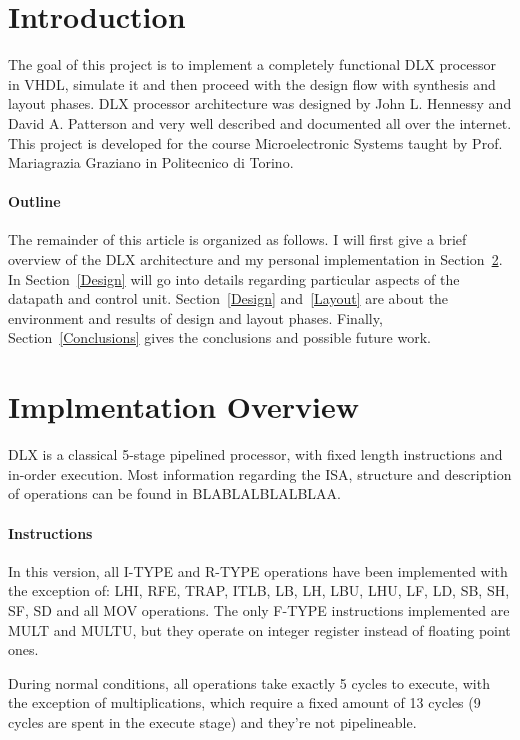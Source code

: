\documentclass[12pt]{article}
\begin{document}
\maketitle


\section{Introduction}
The goal of this project is to implement a completely functional DLX processor in VHDL, simulate it and then proceed with the design flow with synthesis and layout phases.
DLX processor architecture was designed by John L. Hennessy and David A. Patterson and very well described and documented all over the internet.
This project is developed for the course Microelectronic Systems taught by Prof. Mariagrazia Graziano in Politecnico di Torino.



\paragraph{Outline}
The remainder of this article is organized as follows. 
I will first give a brief overview of the DLX architecture and my personal implementation in Section~\ref{Overview}.
In Section~\ref{Design} will go into details regarding particular aspects of the datapath and control unit.
Section~\ref{Design} and~\ref{Layout} are about the environment and results of design and layout phases.
Finally, Section~\ref{Conclusions} gives the conclusions and possible future work.

\section{Implmentation Overview}\label{Overview}
DLX is a classical 5-stage pipelined processor, with fixed length instructions and in-order execution.
Most information regarding the ISA, structure and description of operations can be found in BLABLALBLALBLAA.
\paragraph{Instructions}
In this version, all I-TYPE and R-TYPE operations have been implemented with the exception of: LHI, RFE, TRAP, ITLB, LB, LH, LBU, LHU, LF, LD, SB, SH, SF, SD and all MOV operations.
The only F-TYPE instructions implemented are MULT and MULTU, but they operate on integer register instead of floating point ones.

During normal conditions, all operations take exactly 5 cycles to execute, with the exception of multiplications, which require a fixed amount of 13 cycles (9 cycles are spent in the execute stage) and they're not pipelineable.
\end{document}
